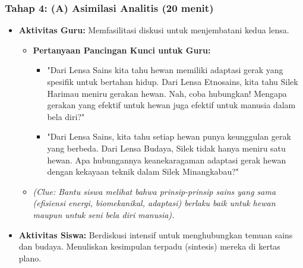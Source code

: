 \documentclass[a4paper,12pt]{article}
\begin{document}
\subsubsection{Tahap 4: (A) Asimilasi Analitis (20 menit)}
\begin{itemize}
\item \textbf{Aktivitas Guru:} Memfasilitasi diskusi untuk menjembatani kedua lensa.
    \begin{itemize}
    \item \textbf{Pertanyaan Pancingan Kunci untuk Guru:}
        \begin{itemize}
        \item "Dari Lensa Sains kita tahu hewan memiliki adaptasi gerak yang spesifik untuk bertahan hidup. Dari Lensa Etnosains, kita tahu Silek Harimau meniru gerakan hewan. Nah, coba hubungkan! Mengapa gerakan yang efektif untuk hewan juga efektif untuk manusia dalam bela diri?"
        \item "Dari Lensa Sains, kita tahu setiap hewan punya keunggulan gerak yang berbeda. Dari Lensa Budaya, Silek tidak hanya meniru satu hewan. Apa hubungannya keanekaragaman adaptasi gerak hewan dengan kekayaan teknik dalam Silek Minangkabau?"
        \end{itemize}
    \item \textit{(Clue: Bantu siswa melihat bahwa prinsip-prinsip sains yang sama (efisiensi energi, biomekanikal, adaptasi) berlaku baik untuk hewan maupun untuk seni bela diri manusia).}
    \end{itemize}
\item \textbf{Aktivitas Siswa:} Berdiskusi intensif untuk menghubungkan temuan sains dan budaya. Menuliskan kesimpulan terpadu (sintesis) mereka di kertas plano.
\end{itemize}
\end{document}
